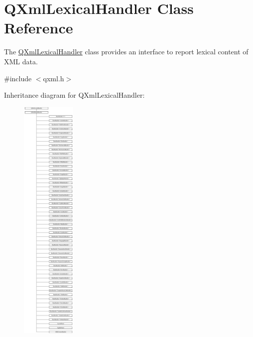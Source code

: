 \hypertarget{class_q_xml_lexical_handler}{}\section{Q\+Xml\+Lexical\+Handler Class Reference}
\label{class_q_xml_lexical_handler}


The \mbox{\hyperlink{class_q_xml_lexical_handler}{Q\+Xml\+Lexical\+Handler}} class provides an interface to report lexical content of X\+ML data.  




{\ttfamily \#include $<$qxml.\+h$>$}

Inheritance diagram for Q\+Xml\+Lexical\+Handler\+:\begin{figure}[H]
\begin{center}
\leavevmode
\includegraphics[height=12.000000cm]{class_q_xml_lexical_handler}
\end{center}
\end{figure}
